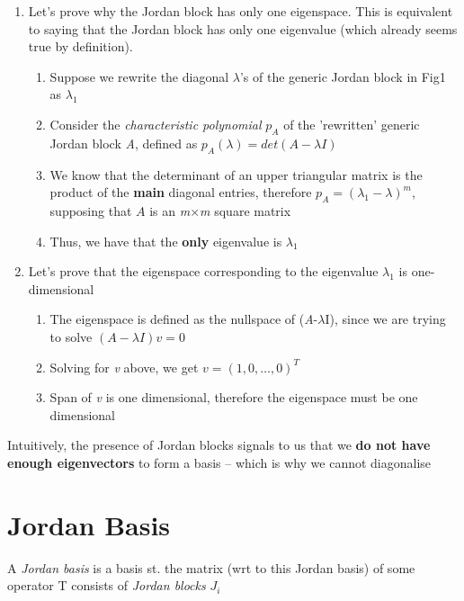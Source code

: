 \documentclass{article}
\begin{document}
\begin{enumerate}[label*=\arabic*.]
    \item Let's prove why the Jordan block has only one eigenspace. 
            This is equivalent to saying that the Jordan block has only one eigenvalue (which already seems true by definition).
            \begin{enumerate}[label*=\arabic*.]
                \item Suppose we rewrite the diagonal $\lambda$'s of the generic Jordan block in Fig1 as $\lambda_{1}$
                \item Consider the \textit{characteristic polynomial} $p_{A}$ of the 'rewritten' generic Jordan block \textit{A}, defined as $p_{A}(\lambda) = det(A - \lambda I)$
                \item We know that the determinant of an upper triangular matrix is the product of the \textbf{main} diagonal entries,
                        therefore $p_{A} = (\lambda_{1}-\lambda)^{m}$, supposing that $A$ is an \textit{m}$\times$\textit{m} square matrix
                \item Thus, we have that the \textbf{only} eigenvalue is $\lambda_{1}$
            \end{enumerate}
    \item Let's prove that the eigenspace corresponding to the eigenvalue $\lambda_{1}$ is one-dimensional
            \begin{enumerate}[label*=\arabic*.]
                \item The eigenspace is defined as the nullspace of (\textit{A}-$\lambda$I), since we are trying to solve $(A-\lambda I)v = 0$
                \item Solving for \textit{v} above, we get $v = (1,0,\dots,0)^{T}$
                \item Span of \textit{v} is one dimensional, therefore the eigenspace must be one dimensional
            \end{enumerate}
\end{enumerate}

\vspace{0.25cm}
Intuitively, the presence of Jordan blocks signals to us that we \textbf{do not have enough eigenvectors} to form a basis -- which is why we cannot diagonalise

\section{Jordan Basis}
A \textit{Jordan basis} is a basis st. the matrix (wrt to this Jordan basis) of some operator T consists of \textit{Jordan blocks} $J_{i}$
\end{document}

